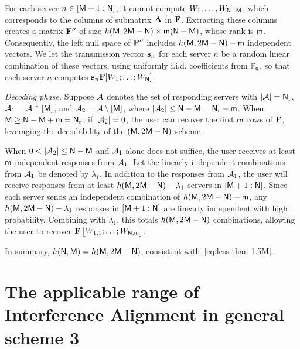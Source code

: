 \documentclass[conference,letterpaper]{IEEEtran}
\begin{document}
For each server $n \in [{\sf M}+1 : {\sf N}]$, it cannot compute $W_1, \ldots, W_{{\sf N} - {\sf M}}$, which corresponds to the columns of submatrix ${\bf A}$ in ${\bf F}$. Extracting these columns creates a matrix ${\bf F}''$ of size $h({\sf M}, 2{\sf M} - {\sf N}) \times {\sf m} ({\sf N} - {\sf M})$, whose rank is ${\sf m}$. Consequently, the left null space of ${\bf F}''$ includes $h({\sf M}, 2{\sf M} - {\sf N}) - {\sf m}$ independent vectors. We let the transmission vector ${\bf s}_n$ for each server $n$ be a random linear combination of these vectors, using uniformly i.i.d. coefficients from $\mathbb{F}_{{\sf q}}$, so that each server $n$ computes ${\bf s}_n {\bf F} [W_1; \ldots; W_{{\sf N}}]$.

{\it Decoding phase.} Suppose ${\cal A}$ denotes the set of responding servers with $|{\cal A}| = {\sf N}_{\rm r}$, ${\cal A}_1 = {\cal A} \cap [{\sf M}]$, and ${\cal A}_2 = {\cal A} \setminus [{\sf M}]$, where $|{\cal A}_2| \leq {\sf N} - {\sf M} = {\sf N}_{\rm r} - {\sf m}$. When ${\sf M} \geq {\sf N} - {\sf M} + {\sf m} = {\sf N}_{\rm r}$, if $|{\cal A}_2| = 0$, the user can recover the first ${\sf m}$ rows of ${\bf F}$, leveraging the decodability of the $({\sf M}, 2{\sf M} - {\sf N})$ scheme.

When $0 < |{\cal A}_2| \leq {\sf N} - {\sf M}$ and ${\cal A}_1$ alone does not suffice, the user receives at least ${\sf m}$ independent responses from ${\cal A}_1$. Let the linearly independent combinations from ${\cal A}_1$ be denoted by $\lambda_1$. In addition to the responses from ${\cal A}_1$, the user will receive responses from at least $h({\sf M}, 2{\sf M} - {\sf N}) - \lambda_1$ servers in $[{\sf M}+1 : {\sf N}]$. Since each server sends an independent combination of $h({\sf M}, 2{\sf M} - {\sf N}) - {\sf m}$, any $h({\sf M}, 2{\sf M} - {\sf N}) - \lambda_1$ responses in $[{\sf M}+1 : {\sf N}]$ are linearly independent with high probability. Combining with $\lambda_1$, this totals $h({\sf M}, 2{\sf M} - {\sf N})$ combinations, allowing the user to recover ${\bf F} \begin{bmatrix} W_{1,1}; \ldots; W_{{\sf N}, {\sf m}} \end{bmatrix}$.

In summary, $h({\sf N}, {\sf M}) = h({\sf M}, 2{\sf M} - {\sf N})$, consistent with~\eqref{eq:less than 1.5M}.



\section{The applicable range of Interference Alignment in general scheme 3
}
\end{document}
